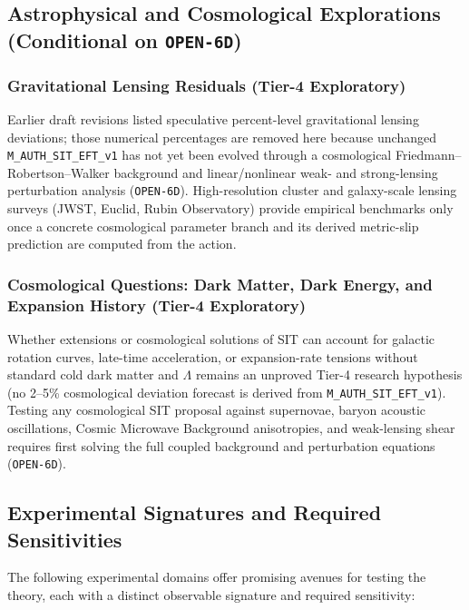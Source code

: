 \subsection{Astrophysical and Cosmological Explorations (Conditional on \texttt{OPEN-6D})}
\label{sec:part2-astro-probes}
\subsubsection{Gravitational Lensing Residuals (Tier-4 Exploratory)}

Earlier draft revisions listed speculative percent-level gravitational lensing deviations; those numerical percentages are removed here because unchanged \texttt{M\_AUTH\_SIT\_EFT\_v1} has not yet been evolved through a cosmological Friedmann--Robertson--Walker background and linear/nonlinear weak- and strong-lensing perturbation analysis (\texttt{OPEN-6D}). High-resolution cluster and galaxy-scale lensing surveys (JWST, Euclid, Rubin Observatory) provide empirical benchmarks only once a concrete cosmological parameter branch and its derived metric-slip prediction are computed from the action.

\subsubsection{Cosmological Questions: Dark Matter, Dark Energy, and Expansion History (Tier-4 Exploratory)}

Whether extensions or cosmological solutions of SIT can account for galactic rotation curves, late-time acceleration, or expansion-rate tensions without standard cold dark matter and $\Lambda$ remains an unproved Tier-4 research hypothesis (no 2--5\% cosmological deviation forecast is derived from \texttt{M\_AUTH\_SIT\_EFT\_v1}). Testing any cosmological SIT proposal against supernovae, baryon acoustic oscillations, Cosmic Microwave Background anisotropies, and weak-lensing shear requires first solving the full coupled background and perturbation equations (\texttt{OPEN-6D}).

\subsection*{Experimental Signatures and Required Sensitivities}

The following experimental domains offer promising avenues for testing the theory, each with a distinct observable signature and required sensitivity:

